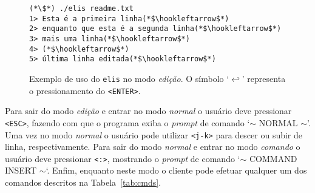 \documentclass[11pt,a4paper]{article}
\begin{document}
\begin{figure}[!ht]

\begin{lstlisting}[numbers=none]
(*\$*) ./elis readme.txt
1> Esta é a primeira linha(*$\hookleftarrow$*)
2> enquanto que esta é a segunda linha(*$\hookleftarrow$*)
3> mais uma linha(*$\hookleftarrow$*)
4> (*$\hookleftarrow$*)
5> última linha editada(*$\hookleftarrow$*)
\end{lstlisting}
   \caption  {Exemplo de uso do \texttt{elis} no modo \textsl{edição}.
       O símbolo `$\hookleftarrow$' representa o pressionamento do \texttt{<ENTER>}.}
   \label{fig:1}
\end{figure}

	Para sair do modo \textsl{edição} e entrar no modo \textsl{normal} o usuário deve pressionar \texttt{<ESC>}, fazendo com que o programa exiba o \emph{prompt} de comando `$\sim$ NORMAL $\sim$'.
Uma vez no modo \textsl{normal} o usuário pode utilizar \texttt{<j-k>} para descer ou subir de linha, respectivamente. Para sair do modo \textsl{normal} e entrar no modo \textsl{comando} o usuário deve pressionar \texttt{<:>}, mostrando o \emph{prompt} de comando `$\sim$ COMMAND INSERT $\sim$`. Enfim, enquanto neste modo o cliente pode efetuar qualquer um dos comandos descritos
na Tabela~\ref{tab:cmds}.
\end{document}
